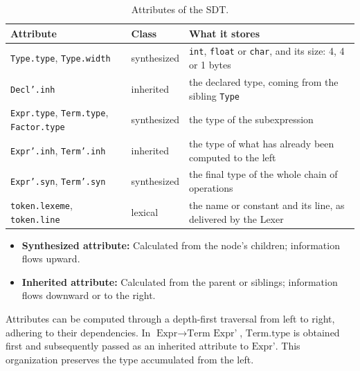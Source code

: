 \documentclass[12pt,letterpaper]{article}
\newcommand{\cod}[1]{\texttt{#1}} %
\newcommand{\anchotabla}{0.9\textwidth} %
\begin{document}
\begin{table}[H]
\centering
\small
\renewcommand{\arraystretch}{1.2}
\begin{tabular}{@{}>{\raggedright\arraybackslash}p{0.31\dimexpr\anchotabla}
                  >{\raggedright\arraybackslash}p{0.14\dimexpr\anchotabla}
                  >{\raggedright\arraybackslash}p{0.51\dimexpr\anchotabla}@{}}
\toprule
\textbf{Attribute} & \textbf{Class} & \textbf{What it stores} \\
\midrule
\cod{Type.type}, \cod{Type.width} & synthesized & \cod{int}, \cod{float} or \cod{char}, and its size: 4, 4 or 1 bytes \\
\addlinespace
\cod{Decl'.inh} & inherited & the declared type, coming from the sibling \cod{Type} \\
\addlinespace
\cod{Expr.type}, \cod{Term.type}, \cod{Factor.type} & synthesized & the type of the subexpression \\
\addlinespace
\cod{Expr'.inh}, \cod{Term'.inh} & inherited & the type of what has already been computed to the left \\
\addlinespace
\cod{Expr'.syn}, \cod{Term'.syn} & synthesized & the final type of the whole chain of operations \\
\addlinespace
\cod{token.lexeme}, \cod{token.line} & lexical & the name or constant and its line, as delivered by the Lexer \\
\bottomrule
\end{tabular}
\caption{Attributes of the SDT.}
\end{table}

\begin{itemize}
    \item \textbf{Synthesized attribute:} Calculated from the node's children; information flows upward.
    \item \textbf{Inherited attribute:} Calculated from the parent or siblings; information flows downward or to the right.
\end{itemize}

Attributes can be computed through a depth-first traversal from left to right, adhering to their dependencies. In $\text{Expr} \rightarrow \text{Term } \text{Expr'}$, $\text{Term.type}$ is obtained first and subsequently passed as an inherited attribute to $\text{Expr'}$. This organization preserves the type accumulated from the left.
\end{document}
